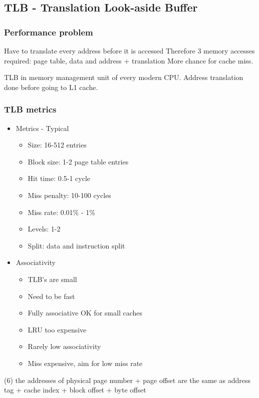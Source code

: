 \documentclass{article}
\begin{document}
	\subsection{TLB - Translation Look-aside Buffer}
		\subsubsection{Performance problem}
			Have to translate every address before it is accessed
			Therefore 3 memory accesses required: page table, data and address + translation
			More chance for cache miss.

			TLB in memory management unit of every modern CPU.
			Address translation done before going to L1 cache.

		\subsubsection{TLB metrics}
			\begin{itemize}
				\item Metrics - Typical
					\begin{itemize}
						\item Size: 16-512 entries
						\item Block size: 1-2 page table entries
						\item Hit time: 0.5-1 cycle
						\item Miss penalty: 10-100 cycles
						\item Miss rate: 0.01\% - 1\%
						\item Levels: 1-2
						\item Split: data and instruction split
					\end{itemize}
					
				\item Associativity
					\begin{itemize}
						\item TLB’s are small
						\item Need to be fast
						\item Fully associative OK for small caches
						\item LRU too expensive
						\item Rarely low associativity
						\item Miss expensive, aim for low miss rate
					\end{itemize}
			\end{itemize}

		(6) the addresses of physical page number + page offset are the same as address tag + cache index + block offset + byte offset
\end{document}
